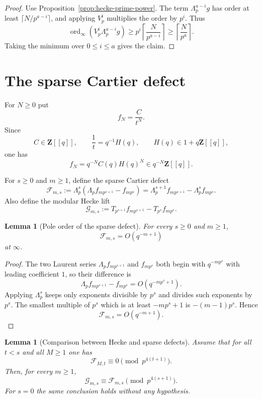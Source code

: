 \documentclass[11pt]{amsart}
\newtheorem{lemma}[theorem]{Lemma}
\theoremstyle{remark}
\DeclareMathOperator{\ord}{ord}
\newcommand{\Z}{\mathbf Z}
\newcommand{\Up}{\Lambda_p}
\newcommand{\Vp}{V_p}
\begin{document}
\begin{proof}
Use Proposition~\ref{prop:hecke-prime-power}.  The term $\Up^{a-i}g$ has order at least $\lceil N/p^{a-i}\rceil$, and applying $\Vp^i$ multiplies the order by $p^i$.  Thus
\[
 \ord_\infty(\Vp^i\Up^{a-i}g)
 \ge p^i\left\lceil\frac{N}{p^{a-i}}\right\rceil
 \ge \left\lceil\frac{N}{p^a}\right\rceil.
\]
Taking the minimum over $0\le i\le a$ gives the claim.
\end{proof}

\section{The sparse Cartier defect}\label{sec:sparse}

For $N\ge0$ put
\[
 f_N=\frac{C}{t^N}.
\]
Since
\[
 C\in\Z[[q]],
 \qquad
 \frac{1}{t}=q^{-1}H(q),
 \qquad
 H(q)\in1+q\Z[[q]],
\]
one has
\[
 f_N=q^{-N}C(q)H(q)^N\in q^{-N}\Z[[q]].
\]

For $s\ge0$ and $m\ge1$, define the sparse Cartier defect
\[
 \mathcal F_{m,s}
 :=\Up^s\left(\Up f_{mp^{s+1}}-f_{mp^s}\right)
 =\Up^{s+1}f_{mp^{s+1}}-\Up^sf_{mp^s}.
\]
Also define the modular Hecke lift
\[
 \mathcal G_{m,s}:=
 T_{p^{s+1}}f_{mp^{s+1}}-T_{p^s}f_{mp^s}.
\]

\begin{lemma}[Pole order of the sparse defect]\label{lem:sparse-pole}
For every $s\ge0$ and $m\ge1$,
\[
 \mathcal F_{m,s}=O(q^{-m+1})
\]
at $\infty$.
\end{lemma}

\begin{proof}
The two Laurent series $\Up f_{mp^{s+1}}$ and $f_{mp^s}$ both begin with $q^{-mp^s}$ with leading coefficient $1$, so their difference is
\[
 \Up f_{mp^{s+1}}-f_{mp^s}=O(q^{-mp^s+1}).
\]
Applying $\Up^s$ keeps only exponents divisible by $p^s$ and divides such exponents by $p^s$.  The smallest multiple of $p^s$ which is at least $-mp^s+1$ is $-(m-1)p^s$.  Hence
\[
 \mathcal F_{m,s}=O(q^{-m+1}).
\]
\end{proof}

\begin{lemma}[Comparison between Hecke and sparse defects]\label{lem:G-F-comparison}
Assume that for all $t<s$ and all $M\ge1$ one has
\[
 \mathcal F_{M,t}\equiv0\pmod {p^{4(t+1)}}.
\]
Then, for every $m\ge1$,
\[
 \mathcal G_{m,s}\equiv \mathcal F_{m,s}\pmod {p^{4(s+1)}}.
\]
For $s=0$ the same conclusion holds without any hypothesis.
\end{lemma}
\end{document}
